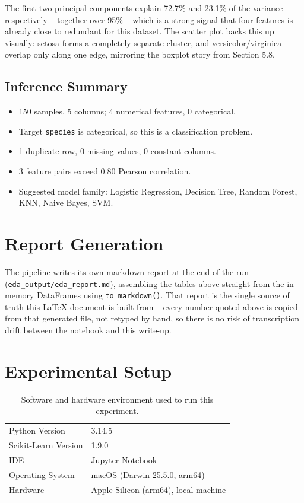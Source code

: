 \documentclass[11pt,a4paper]{article}
\begin{document}
The first two principal components explain 72.7\% and 23.1\% of the variance respectively -- together over 95\% -- which is a strong signal that four features is already close to redundant for this dataset. The scatter plot backs this up visually: setosa forms a completely separate cluster, and versicolor/virginica overlap only along one edge, mirroring the boxplot story from Section 5.8.

\subsection{Inference Summary}
\begin{itemize}[nosep]
  \item 150 samples, 5 columns; 4 numerical features, 0 categorical.
  \item Target \texttt{species} is categorical, so this is a classification problem.
  \item 1 duplicate row, 0 missing values, 0 constant columns.
  \item 3 feature pairs exceed 0.80 Pearson correlation.
  \item Suggested model family: Logistic Regression, Decision Tree, Random Forest, KNN, Naive Bayes, SVM.
\end{itemize}

\section{Report Generation}
The pipeline writes its own markdown report at the end of the run (\texttt{eda\_output/eda\_report.md}), assembling the tables above straight from the in-memory DataFrames using \texttt{to\_markdown()}. That report is the single source of truth this LaTeX document is built from -- every number quoted above is copied from that generated file, not retyped by hand, so there is no risk of transcription drift between the notebook and this write-up.

\section{Experimental Setup}
\begin{table}[h]
\centering
\begin{tabular}{ll}
\toprule
Python Version & 3.14.5 \\
Scikit-Learn Version & 1.9.0 \\
IDE & Jupyter Notebook \\
Operating System & macOS (Darwin 25.5.0, arm64) \\
Hardware & Apple Silicon (arm64), local machine \\
\bottomrule
\end{tabular}
\caption{Software and hardware environment used to run this experiment.}
\end{table}
\end{document}
